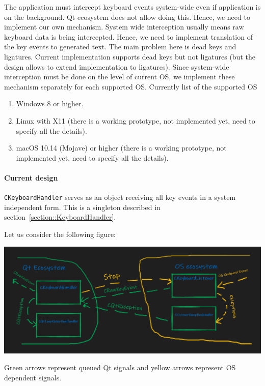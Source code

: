 \documentclass{article}
\begin{document}
The application must intercept keyboard events system-wide even if application is on the background. Qt ecosystem does not allow doing this. Hence, we need to implement our own mechanism. System wide interception usually means raw keyboard data is being intercepted. Hence, we need to implement translation of the key events to generated text. The main problem here is dead keys and ligatures. Current implementation supports dead keys but not ligatures (but the design allows to extend implementation to ligatures). Since system-wide interception must be done on the level of current OS, we implement these mechanism separately for each supported OS. Currently list of the supported OS
\begin{enumerate}
\item Windows 8 or higher.
\item Linux with X11 (there is a working prototype, not implemented yet, need to specify all the details).
\item macOS 10.14 (Mojave) or higher (there is a working prototype, not implemented yet, need to specify all the details).
\end{enumerate}

\paragraph{Current design}

\verb"CKeyboardHandler" serves as an object receiving all key events in a system independent form. This is a singleton described in section~\ref{section::KeyboardHandler}.

Let us consider the following figure:
\begin{center}
\includegraphics[scale = 0.5]{Figures/KeyboardInterception.png}

Green arrows represent queued Qt signals and yellow arrows represent OS dependent signals.
\end{center}
\end{document}
